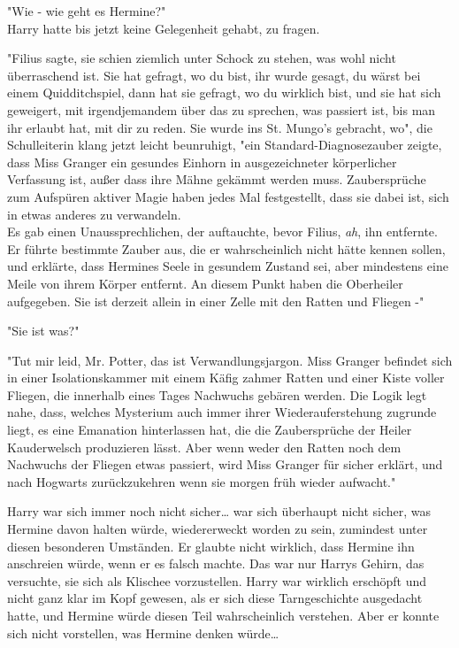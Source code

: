 {"Wie - wie geht es Hermine?"\\ Harry hatte bis jetzt keine Gelegenheit gehabt, zu fragen.

"Filius sagte, sie schien ziemlich unter Schock zu stehen, was wohl nicht überraschend ist. Sie hat gefragt, wo du bist, ihr wurde gesagt, du wärst bei einem Quidditchspiel, dann hat sie gefragt, wo du wirklich bist, und sie hat sich geweigert, mit irgendjemandem über das zu sprechen, was passiert ist, bis man ihr erlaubt hat, mit dir zu reden. Sie wurde ins St. Mungo's gebracht, wo", die Schulleiterin klang jetzt leicht beunruhigt, "ein Standard-Diagnosezauber zeigte, dass Miss Granger ein gesundes Einhorn in ausgezeichneter körperlicher Verfassung ist, außer dass ihre Mähne gekämmt werden muss. Zaubersprüche zum Aufspüren aktiver Magie haben jedes Mal festgestellt, dass sie dabei ist, sich in etwas anderes zu verwandeln.\\ Es gab einen Unaussprechlichen, der auftauchte, bevor Filius, \emph{ah}, ihn entfernte. Er führte bestimmte Zauber aus, die er wahrscheinlich nicht hätte kennen sollen, und erklärte, dass Hermines Seele in gesundem Zustand sei, aber mindestens eine Meile von ihrem Körper entfernt. An diesem Punkt haben die Oberheiler aufgegeben. Sie ist derzeit allein in einer Zelle mit den Ratten und Fliegen -"

"Sie ist was?"

"Tut mir leid, Mr. Potter, das ist Verwandlungsjargon. Miss Granger befindet sich in einer Isolationskammer mit einem Käfig zahmer Ratten und einer Kiste voller Fliegen, die innerhalb eines Tages Nachwuchs gebären werden. Die Logik legt nahe, dass, welches Mysterium auch immer ihrer Wiederauferstehung zugrunde liegt, es eine Emanation hinterlassen hat, die die Zaubersprüche der Heiler Kauderwelsch produzieren lässt. Aber wenn weder den Ratten noch dem Nachwuchs der Fliegen etwas passiert, wird Miss Granger für sicher erklärt, und nach Hogwarts zurückzukehren wenn sie morgen früh wieder aufwacht."

Harry war sich immer noch nicht sicher… war sich überhaupt nicht sicher, was Hermine davon halten würde, wiedererweckt worden zu sein, zumindest unter diesen besonderen Umständen. Er glaubte nicht wirklich, dass Hermine ihn anschreien würde, wenn er es falsch machte. Das war nur Harrys Gehirn, das versuchte, sie sich als Klischee vorzustellen. Harry war wirklich erschöpft und nicht ganz klar im Kopf gewesen, als er sich diese Tarngeschichte ausgedacht hatte, und Hermine würde diesen Teil wahrscheinlich verstehen. Aber er konnte sich nicht vorstellen, was Hermine denken würde…

}
